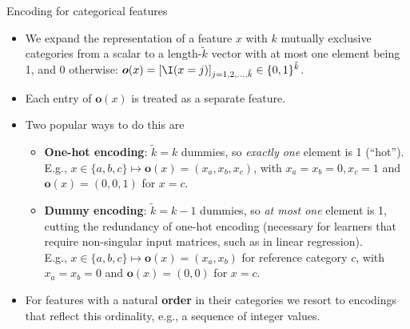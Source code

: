 \begin{vbframe}{Encoding for categorical features}

\begin{itemize}
  \small
  \item We expand the representation of a feature $x$
  with $k$ mutually exclusive categories from a scalar
  to a length-$\tilde k$ vector with at most one
  element being 1, and 0 otherwise: $\bm{o}(x) = [\I(x = j)]_{
  j = 1, 2, \dots, \tilde k} \in \{0,1\}^{\tilde k}$.
  \item Each entry of $\bm{o}(x)$ is treated as a separate feature.
  \item Two popular ways to do this are
  \begin{itemize}
    \footnotesize
    \item \textbf{One-hot encoding}: $\tilde k = k$ dummies, so \textit{exactly
    one} element is 1 (\enquote{hot}).
    E.g., $x \in \{ a, b, c\} \mapsto \bm{o}(x) = (x_a, x_b, x_c)$, with
    $x_a = x_b = 0, x_c = 1$ and $\bm{o}(x) = (0, 0, 1)$ for $x = c$.
    \item \textbf{Dummy encoding}: $\tilde k = k - 1$ dummies, so
    \textit{at most one} element is 1, cutting the redundancy of one-hot
    encoding (necessary for learners that require non-singular input matrices,
    such as in linear regression). \\
    E.g., $x \in \{ a, b, c\} \mapsto \bm{o}(x) = (x_a, x_b)$ for reference
    category $c$, with $x_a = x_b = 0$ and $\bm{o}(x) = (0, 0)$ for $x = c$.
  \end{itemize}
  \item For features with a natural \textbf{order} in their categories we
  resort to encodings that reflect this ordinality, e.g., a sequence
  of integer values.
\end{itemize}

\end{vbframe}



